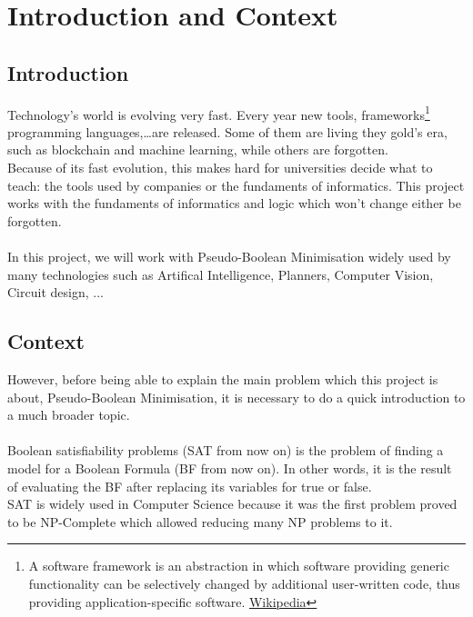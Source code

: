 \chapter{Introduction and Context}
\label{Chapter1}

\section{Introduction}
Technology's world is evolving very fast. Every year new tools, frameworks\footnote{A software framework is an abstraction in which software providing generic functionality can be selectively changed by additional user-written code, thus providing application-specific software. \href{https://en.wikipedia.org/wiki/Software_framework}{Wikipedia}} programming languages,\ldots are released. Some of them are living they gold's era, such as blockchain and machine learning,  while others are forgotten.  \\
Because of its fast evolution, this makes hard for universities decide what to teach: the tools used by companies or the fundaments of informatics. 
This project works with the fundaments of informatics and logic which won't change either be forgotten.\\\\
In this project, we will work with Pseudo-Boolean Minimisation widely used by many technologies such as Artifical Intelligence, Planners, Computer Vision,  Circuit design, ... 


\section{Context} 

However, before being able to explain the main problem which this project is about, Pseudo-Boolean Minimisation, it is necessary to do a quick introduction to a much broader topic. \\\\
Boolean satisfiability problems (SAT from now on) is the problem of finding a model for a Boolean Formula (BF from now on). In other words, it is the result of evaluating the BF after replacing its variables for true or false. \\
SAT is widely used in Computer Science because it was the first problem proved to be NP-Complete which allowed reducing many NP problems to it\cite{Cook1971}.

